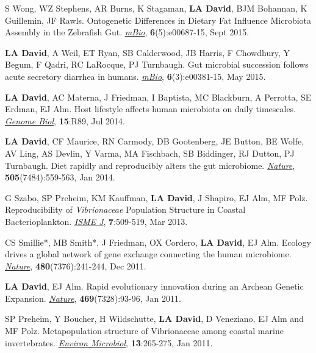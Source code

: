 \documentclass[overlapped,line,11pt]{res}
\begin{document}
\begin{resume}
\begin{revnumerate}[29]
\item {S Wong, WZ Stephens, AR Burns, K Stagaman, \textbf{LA David},
  BJM Bohannan, K Guillemin, JF Rawls.  Ontogenetic Differences in
  Dietary Fat Influence Microbiota Assembly in the Zebrafish Gut.
  \emph{\underline{mBio}}, \textbf{6}(5):e00687-15, Sept 2015.}

\item {\textbf{LA David}, A Weil, ET Ryan, SB Calderwood, JB Harris, F
  Chowdhury, Y Begum, F Qadri, RC LaRocque, PJ Turnbaugh.  Gut
  microbial succession follows acute secretory diarrhea in humans.
 \emph{\underline{mBio}}, \textbf{6}(3):e00381-15, May 2015.}

\item {\textbf{LA David}, AC Materna, J Friedman, I Baptista, MC
  Blackburn, A Perrotta, SE Erdman, EJ Alm.  Host lifestyle affects
  human microbiota on daily timescales.
  \emph{\underline{Genome Biol}}, \textbf{15}:R89, Jul 2014.}

\item {\textbf{LA David}, CF Maurice, RN Carmody, DB Gootenberg, JE
  Button, BE Wolfe, AV Ling, AS Devlin, Y Varma, MA Fischbach, SB
  Biddinger, RJ Dutton, PJ Turnbaugh.  Diet rapidly and reproducibly
  alters the gut microbiome. \emph{\underline{Nature}},
  \textbf{505}(7484):559-563, Jan 2014.}

\item {G Szabo, SP Preheim, KM Kauffman, \textbf{LA David}, J Shapiro,
  EJ Alm, MF Polz.  Reproducibility of \emph{Vibrionaceae} Population
  Structure in Coastal Bacterioplankton. \emph{\underline{ISME J}},
  \textbf{7}:509-519, Mar 2013.}

\item {CS Smillie*, MB Smith*, J Friedman, OX Cordero, \textbf{LA
    David}, EJ Alm.  Ecology drives a global network of gene exchange
  connecting the human microbiome. \emph{\underline{Nature}},
  \textbf{480}(7376):241-244, Dec 2011.}

\item {\textbf{LA David}, EJ Alm.  Rapid evolutionary innovation during
  an Archean Genetic Expansion.  \emph{\underline{Nature}},
  \textbf{469}(7328):93-96, Jan 2011.}

\vspace*{1mm}
\item {SP Preheim, Y Boucher, H Wildschutte, \textbf{LA David},
  D Veneziano, EJ Alm and MF Polz.  Metapopulation
  structure of Vibrionaceae among coastal marine
  invertebrates. \emph{\underline{Environ Microbiol}}, \textbf{13}:265-275, Jan 2011.} 


\end{revnumerate}
\end{resume}
\end{document}
